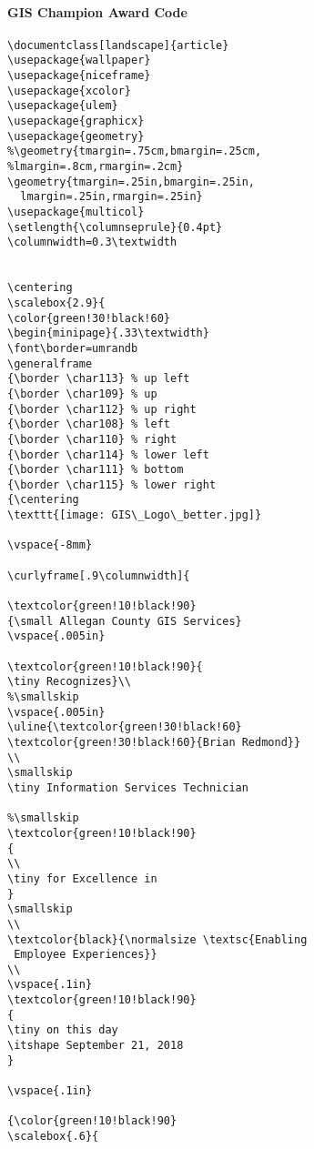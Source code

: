 \paragraph{GIS Champion Award Code}
\vspace{.2in}
%
\begin{verbatim}
\documentclass[landscape]{article}
\usepackage{wallpaper}
\usepackage{niceframe}
\usepackage{xcolor}
\usepackage{ulem}
\usepackage{graphicx}
\usepackage{geometry}
%\geometry{tmargin=.75cm,bmargin=.25cm,
%lmargin=.8cm,rmargin=.2cm}
\geometry{tmargin=.25in,bmargin=.25in,
  lmargin=.25in,rmargin=.25in}
\usepackage{multicol}
\setlength{\columnseprule}{0.4pt}
\columnwidth=0.3\textwidth


\centering
\scalebox{2.9}{
\color{green!30!black!60}
\begin{minipage}{.33\textwidth}
\font\border=umrandb
\generalframe
{\border \char113} % up left
{\border \char109} % up
{\border \char112} % up right
{\border \char108} % left
{\border \char110} % right
{\border \char114} % lower left
{\border \char111} % bottom
{\border \char115} % lower right
{\centering
\texttt{[image: GIS\_Logo\_better.jpg]}

\vspace{-8mm}

\curlyframe[.9\columnwidth]{

\textcolor{green!10!black!90}
{\small Allegan County GIS Services}
\vspace{.005in}

\textcolor{green!10!black!90}{
\tiny Recognizes}\\
%\smallskip
\vspace{.005in}
\uline{\textcolor{green!30!black!60}
\textcolor{green!30!black!60}{Brian Redmond}}
\\
\smallskip
\tiny Information Services Technician

%\smallskip
\textcolor{green!10!black!90}
{
\\
\tiny for Excellence in
}
\smallskip
\\
\textcolor{black}{\normalsize \textsc{Enabling
 Employee Experiences}}
\\
\vspace{.1in}
\textcolor{green!10!black!90}
{
\tiny on this day
\itshape September 21, 2018
}

\vspace{.1in}

{\color{green!10!black!90}
\scalebox{.6}{
\end{verbatim}

